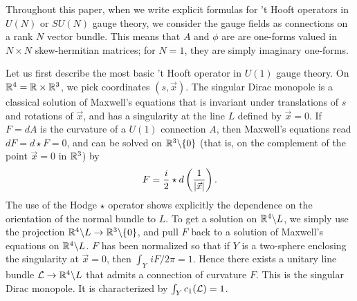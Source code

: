 Throughout this paper, when we write explicit formulas for 't Hooft operators in $U(N)$
or $SU(N)$ gauge theory, we consider the gauge fields as connections on a rank $N$ vector
bundle.  This means that $A$ and $\phi$ are are one-forms valued in
$N\times N$ skew-hermitian matrices; for $N=1$, they are simply imaginary one-forms.

Let us first describe the most basic 't Hooft operator in $U(1)$
gauge theory. On $\Bbb{R}^4=\Bbb{R}\times \Bbb{R}^3$, we pick
coordinates $(s,\vec x)$.  The singular Dirac monopole is a
classical solution of Maxwell's equations that is invariant under
translations of $s$ and rotations of $\vec x$, and has a
singularity at the line $L$ defined by $\vec x=0$. If $F=dA$ is
the curvature of a $U(1)$ connection $A$, then Maxwell's equations
read $dF=d\star F=0$, and can be solved on $\Bbb{R}^3\backslash
\{0\}$ (that is, on the complement of the point $\vec x=0$ in
$\Bbb{R}^3$) by %
\setcounter{equation}{6}
\begin{equation}\label{eq:izo}
F={i\over 2}\star d\left({1\over |\vec
x|}\right).
\end{equation}
  The use of the Hodge $\star$ operator shows
explicitly the dependence on the orientation of the normal bundle
to $L$.  To get a solution on $\Bbb{R}^4\backslash L$, we simply
use the projection $\Bbb{R}^4\backslash L\to \Bbb{R}^3\backslash
\{0\}$, and pull $F$ back to a solution of Maxwell's equations on
$\Bbb{R}^4\backslash L$.
 $F$ has been normalized so that
if $Y$ is a two-sphere enclosing the singularity at $\vec x=0$,
then $\int_Y \,iF/2\pi =1$.  Hence there exists a unitary line
bundle ${\cal L}\to \Bbb{R}^4\backslash L$  that admits a
connection of curvature $F$. This is the singular Dirac monopole.
It is characterized by $\int_Yc_1({\cal L})=1$.

